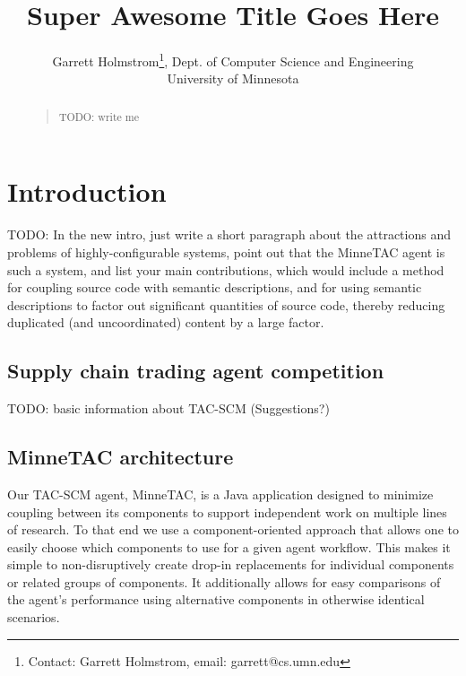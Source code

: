 \documentclass{article}
\begin{document}
\title{Super Awesome Title Goes Here}

\author{Garrett Holmstrom\thanks{Contact: Garrett Holmstrom, email: garrett@cs.umn.edu}, Dept. of Computer Science and Engineering \\ University of Minnesota
}

\date{}

\maketitle

\begin{abstract}
\begin{quote}
TODO:  write me
\end{quote}
\end{abstract}

\section{Introduction}

TODO:  In the new intro, just write a short paragraph about the attractions and problems of highly-configurable systems, point out that the MinneTAC agent is such a system, and list your main contributions, which would include a method for coupling source code with semantic descriptions, and for using semantic descriptions to factor out significant quantities of source code, thereby reducing duplicated (and uncoordinated) content by a large factor.

\subsection{Supply chain trading agent competition}
TODO:  basic information about TAC-SCM  (Suggestions?)

\subsection{MinneTAC architecture}

Our TAC-SCM agent, MinneTAC, is a Java application designed to minimize coupling between its components to support independent work on multiple lines of research.
To that end we use a component-oriented approach that allows one to easily choose which components to use for a given agent workflow.
This makes it simple to non-disruptively create drop-in replacements for individual components or related groups of components.
It additionally allows for easy comparisons of the agent's performance using alternative components in otherwise identical scenarios.
\end{document}

